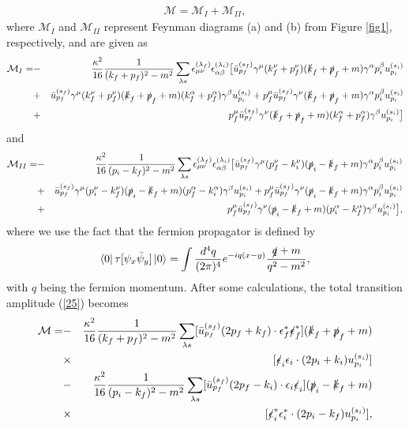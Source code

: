 \documentclass[11pt,showpacs,preprintnumbers,amsmath,amssymb,prd,nofootinbib,superscriptaddress]{revtex4-2}
\begin{document}
\begin{eqnarray}
     \mathcal{M}=\mathcal{M}_{I}+\mathcal{M}_{II},\label{25}
\end{eqnarray}
where $\mathcal{M}_{I}$ and $\mathcal{M}_{II}$ represent Feynman diagrams (a) and (b) from Figure \ref{fig1}, respectively, and are given as
\begin{eqnarray}
    \mathcal{M}_{I}=&-&\frac{\kappa^2}{16}\frac{1}{(k_f+p_f)^2-m^2}\sum_{\lambda s}\epsilon_{\mu\nu}^{(\lambda_f)}\epsilon_{\alpha\beta}^{(\lambda_i)}\big[\Bar{u}^{(s_f)}_{p_f}\gamma^\mu(k_f^\nu+p_f^\nu)(\slashed{k}_f+\slashed{p}_f+m)\gamma^\alpha p_i^\beta u^{(s_i)}_{p_i}\nonumber\\
    &+&\Bar{u}^{(s_f)}_{p_f}\gamma^\mu(k_f^\nu+p_f^\nu)(\slashed{k}_f+\slashed{p}_f+m)
    (k_f^\alpha+p_f^\alpha) \gamma^\beta u^{(s_i)}_{p_i}+p_f^\mu\Bar{u}^{(s_f)}_{p_f}\gamma^\nu(\slashed{k}_f+\slashed{p}_f+m)\gamma^\alpha p_i^\beta u^{(s_i)}_{p_i}\nonumber\\
    &+&p_f^\mu \Bar{u}^{(s_f)}_{p_f}\gamma^\nu(\slashed{k}_f+\slashed{p}_f+m)(k_f^\alpha +p_f^\alpha)\gamma^\beta u^{(s_i)}_{p_i}\big]\label{M1}
\end{eqnarray}
and
\begin{eqnarray}
    \mathcal{M}_{II}=&-&\frac{\kappa^2}{16}\frac{1}{(p_i-k_f)^2-m^2}\sum_{\lambda s}\epsilon_{\mu\nu}^{(\lambda_f)}\epsilon_{\alpha\beta}^{(\lambda_i)}\big[\Bar{u}^{(s_f)}_{p_f}\gamma^\mu(p_f^\nu-k_i^\nu)(\slashed{p}_i-\slashed{k}_f+m)\gamma^\alpha p_i^\beta u^{(s_i)}_{p_i}\nonumber\\
    &+&\Bar{u}^{(s_f)}_{p_f}\gamma^\mu(p_i^\nu-k_f^\nu)(\slashed{p}_i-\slashed{k}_f+m)(p_f^\alpha-k_i^\alpha)\gamma^\beta u^{(s_i)}_{p_i}+p_f^\mu \Bar{u}^{(s_f)}_{p_f}\gamma^\nu(\slashed{p}_i-\slashed{k}_f+m)\gamma^\alpha p_i^\beta u^{(s_i)}_{p_i}\nonumber\\
    &+&p_f^\mu \Bar{u}^{(s_f)}_{p_f}\gamma^\nu(\slashed{p}_i-\slashed{k}_f+m)(p_i^\alpha -k_f^\alpha)\gamma^\beta u^{(s_i)}_{p_i}\big],\label{M2}
\end{eqnarray}
where we use the fact that the fermion propagator is defined by
\begin{eqnarray}
    \bra{0}\tau[\psi_x \Bar{\psi}_y]\ket{0}=\int \frac{d^4q}{(2\pi)^4}e^{-iq(x-y)}\frac{\slashed{q}+m}{q^2-m^2},
\end{eqnarray}
with $q$ being the fermion momentum. After some calculations, the total transition amplitude (\ref{25}) becomes
\begin{eqnarray}
    \mathcal{M}=&-&\frac{\kappa^2}{16}\frac{1}{(k_f+p_f)^2-m^2}\sum_{\lambda s}[\Bar{u}^{(s_f)}_{p_f}(2p_f+k_f)\cdot\epsilon_f^*\slashed{\epsilon}_f^*](\slashed{k}_f+\slashed{p}_f+m)\nonumber\\
    &\times&[\slashed{\epsilon}_i\epsilon_i\cdot(2p_i+k_i) u^{(s_i)}_{p_i}]\nonumber\\
    &-&\frac{\kappa^2}{16}\frac{1}{(p_i-k_f)^2-m^2}\sum_{\lambda s}[\Bar{u}^{(s_f)}_{p_f}(2p_f-k_i)\cdot\epsilon_i\slashed{\epsilon}_i](\slashed{p}_i-\slashed{k}_f+m)\nonumber\\
    &\times&[\slashed{\epsilon}_i^*\epsilon_i^*\cdot(2p_i-k_f)u^{(s_i)}_{p_i}],
\end{eqnarray}
\end{document}
